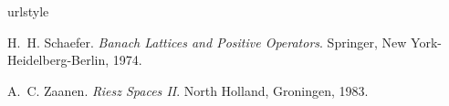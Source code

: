 
\begin{thebibliography}{2}
\providecommand{\natexlab}[1]{#1}
\providecommand{\url}[1]{\texttt{#1}}
\expandafter\ifx\csname urlstyle\endcsname\relax
  \providecommand{\doi}[1]{doi: #1}\else
  \providecommand{\doi}{doi: \begingroup \urlstyle{rm}\Url}\fi

H.~H. Schaefer.
\newblock \emph{Banach Lattices and Positive Operators}.
\newblock Springer, New York-Heidelberg-Berlin, 1974.

A.~C. Zaanen.
\newblock \emph{Riesz Spaces {II}}.
\newblock North Holland, Groningen, 1983.

\end{thebibliography}